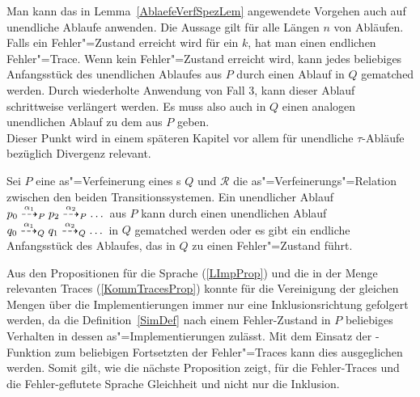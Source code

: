Man kann das in Lemma~\ref{AblaefeVerfSpezLem} angewendete Vorgehen auch auf
unendliche Ablaufe anwenden. Die Aussage gilt für alle Längen $n$ von Abläufen.
Falls ein Fehler"=Zustand erreicht wird für ein $k$, hat man einen endlichen
Fehler"=Trace. Wenn kein Fehler"=Zustand erreicht wird, kann jedes beliebiges
Anfangsstück des unendlichen Ablaufes aus $P$ durch einen Ablauf in $Q$
gematched werden. Durch wiederholte Anwendung von Fall 3, kann dieser Ablauf
schrittweise verlängert werden. Es muss also auch in $Q$ einen analogen
unendlichen Ablauf zu dem aus $P$ geben.\\
Dieser Punkt wird in einem späteren Kapitel vor allem für unendliche
$\tau$-Abläufe bezüglich Divergenz relevant.

\begin{Kor}
  \label{unendlAblKor}
  Sei $P$ eine as"=Verfeinerung eines \MEIO{}s $Q$ und $\mathcal{R}$ die
  as"=Verfeinerungs"=Relation zwischen den beiden Transitionssystemen. Ein
  unendlicher Ablauf $p_0 \may[\alpha _1]_P p_2 \may[\alpha _2]_P \dots$ aus
  $P$ kann durch einen unendlichen Ablauf $q_0 \may[\alpha _1]_Q q_1
  \may[\alpha _2]_Q \dots$ in $Q$ gematched werden oder es gibt ein endliche
  Anfangsstück des Ablaufes, das in $Q$ zu einen Fehler"=Zustand führt.
\end{Kor}

Aus den Propositionen für die Sprache (\ref{LImpProp}) und die in der Menge
\ET{} relevanten Traces (\ref{KommTracesProp}) konnte für die Vereinigung der
gleichen Mengen über die Implementierungen immer nur eine Inklusionsrichtung
gefolgert werden, da die Definition~\ref{SimDef} nach einem Fehler-Zustand in
$P$ beliebiges Verhalten in dessen as"=Implementierungen zulässt. Mit dem
Einsatz der \cont{}-Funktion zum beliebigen Fortsetzten der Fehler"=Traces kann
dies ausgeglichen werden. Somit gilt, wie die nächste Proposition zeigt, für
die Fehler-Traces und die Fehler-geflutete Sprache Gleichheit und nicht nur die
Inklusion.

